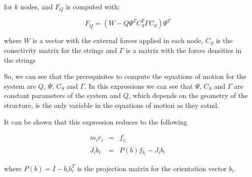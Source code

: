     for $k$ nodes, and $F_Q$ is computed with:

    \begin{equation}
        F_Q = \left( W - Q \Psi^T C_S^T \Gamma C_S \right) \Psi^T
    \end{equation}

    where $W$ is a vector with the external forces applied in each node, $C_S$ is the conectivity matrix for the strings and $\Gamma$ is a matrix with the forces densities in the strings

    So, we can see that the prerequisites to compute the equations of motion for the system are $Q$, $\Psi$, $C_S$ and $\Gamma$.
    In this expressions we can see that $\Psi$, $C_S$ and $\Gamma$ are constant parameters of the system and $Q$, which depends on the geometry of the structure, is the only variable in the equations of motion as they satnd.

    It can be shown that this expression reduces to the following

    \begin{eqnarray}
        m_i \ddot{r}_i & = & f_{r_i} \nonumber \\
        J_i \ddot{b}_i & = & P(b) f_{b_i} - J_i b_i
    \end{eqnarray}

    where $P(b) = I - b_i b_i^T$ is the projection matrix for the orientation vector $b_i$.
